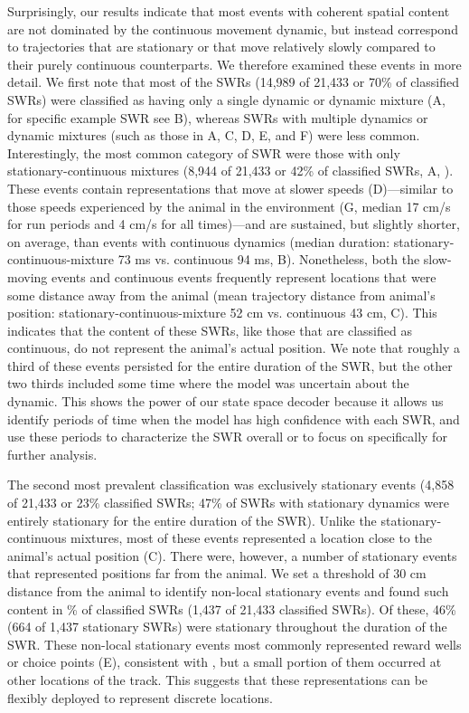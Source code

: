 \documentclass[9pt,lineno]{elife}
\providecommand{\DIFadd}[1]{{\protect\color{blue}\uwave{#1}}} %
\providecommand{\DIFaddbegin}{} %
\providecommand{\DIFaddend}{} %
\newcommand{\DIFaddincludegraphics}[2][]{{\color{blue}\fbox{\DIFOincludegraphics[#1]{#2}}}} %
\DeclareRobustCommand{\DIFaddbegin}{\DIFOaddbegin \let\includegraphics\DIFaddincludegraphics} %
\DeclareRobustCommand{\DIFaddend}{\DIFOaddend \let\includegraphics\DIFOincludegraphics} %
\begin{document}
Surprisingly, our results indicate that most events with coherent spatial content are not dominated by the continuous movement dynamic, but instead correspond to trajectories that are stationary or that move relatively slowly compared to their purely continuous counterparts. We therefore examined these events in more detail. We first note that most of the SWRs (14,989 of 21,433 or 70\% of classified SWRs) were classified as having only a single dynamic or dynamic mixture (A, for specific example SWR see B), whereas SWRs with multiple dynamics or dynamic mixtures (such as those in A, C, D, E, and F) were less common. Interestingly, the most common category of SWR were those with only stationary-continuous mixtures (8,944 of 21,433 or 42\% of classified SWRs, A, \FIGSUPP[5]{fig5sup1}\DIFaddbegin \DIFadd{, note that this percentage ignores the unclassified category}\DIFaddend ). These events contain representations that move at slower speeds (D)---similar to those speeds experienced by the animal in the environment (G, median 17 cm/s for run periods and 4 cm/s for all times)---and are sustained, but slightly shorter, on average, than events with continuous dynamics (median duration: stationary-continuous-mixture 73 ms vs. continuous 94 ms, B). Nonetheless, both the slow-moving events and continuous events frequently represent locations that were some distance away from the animal (mean trajectory distance from animal's position: stationary-continuous-mixture 52 cm vs. continuous 43 cm, C). This indicates that the content of these SWRs, like those that are classified as continuous, do not represent the animal's actual position. We note that roughly a third of these events persisted for the entire duration of the SWR, but the other two thirds included some time where the model was uncertain about the dynamic. This shows the power of our state space decoder because it allows us identify periods of time when the model has high confidence with each SWR, and use these periods to characterize the SWR overall or to focus on specifically for further analysis. 

The second most prevalent classification was exclusively stationary events (4,858 of 21,433 or 23\% classified SWRs; 47\% of SWRs with stationary dynamics were entirely stationary for the entire duration of the SWR). Unlike the stationary-continuous mixtures, most of these events represented a location close to the animal's actual position (C). There were, however, a number of stationary events that represented positions far from the animal. We set a threshold of 30 cm distance from the animal to identify non-local stationary events and found such content in \% of classified SWRs (1,437 of 21,433 classified SWRs). Of these, 46\% (664 of 1,437 stationary SWRs) were stationary throughout the duration of the SWR. These non-local stationary events most commonly represented reward wells or choice points (E), consistent with \citep{YuDistincthippocampalcorticalmemory2017}, but a small portion of them occurred at other locations of the track. This suggests that these representations can be flexibly deployed to represent discrete locations.
\end{document}
